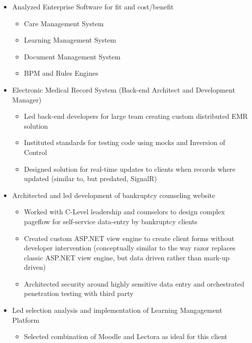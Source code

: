\documentclass[12pt,letterpaper,sans]{moderncv}
\begin{document}
    \begin{itemize}[leftmargin=1.24in]
        \item Analyzed Enterprise Software for fit and cost/benefit
            \begin{itemize}
                \item Care Management System
                \item Learning Management System
                \item Document Management System
                \item BPM and Rules Engines
            \end{itemize}        
        \item Electronic Medical Record System (Back-end Architect and Development Manager)
            \begin{itemize}
                \item Led back-end developers for large team creating custom distributed EMR solution 
                \item Instituted standards for testing code using mocks and Inversion of Control
                \item Designed solution for real-time updates to clients when records where updated (similar to, but predated, SignalR)
            \end{itemize}
        \item Architected and led development of bankruptcy counseling website
            \begin{itemize}
                \item Worked with C-Level leadership and counselors to design complex pageflow for self-service data-entry by bankruptcy clients
                \item Created custom ASP.NET view engine to create client forms without developer intervention (conceptually similar to the way razor replaces classic ASP.NET view engine, but data driven rather than mark-up driven)
                \item Architected security around highly sensitive data entry and orchestrated penetration testing with third party
            \end{itemize}
        \item Led selection analysis and implementation of Learning Mangagement Platform
            \begin{itemize}
                \item Selected combination of Moodle and Lectora as ideal for this client

\end{itemize}
\end{itemize}
\end{document}
